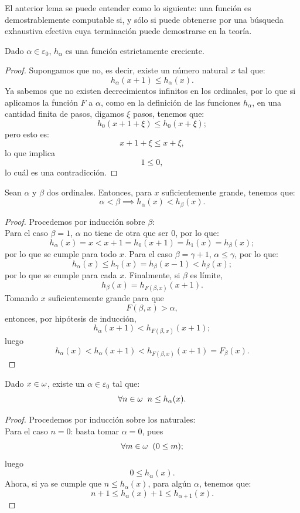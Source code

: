 \begin{obs}
    El anterior lema se puede entender como lo siguiente: una función es demostrablemente computable si, y sólo si puede obtenerse por una búsqueda exhaustiva efectiva cuya terminación puede demostrarse en la teoría.
\end{obs}

\begin{prop} \label{estcrec}
    Dado $\alpha\in\varepsilon_0$, $h_\alpha$ es una función estrictamente creciente.
\end{prop}
\begin{proof}
    Supongamos que no, es decir, existe un número natural $x$ tal que:
    \[h_\alpha(x+1)\leq h_\alpha(x).\]
    Ya sabemos que no existen decrecimientos infinitos en los ordinales, por lo que si aplicamos la función $F$ a $\alpha$, como en la definición de las funciones $h_\alpha$, en una cantidad finita de pasos, digamos $\xi$ pasos, tenemos que:
    \[h_0(x+1+\xi)\leq h_0(x+\xi);\]
    pero esto es:
    \[x+1+\xi\leq x+\xi,\]
    lo que implica
    \[1\leq 0,\]
    lo cuál es una contradicción.
\end{proof}
\begin{prop} \label{paralonoestandarxdxdxd}
    Sean $\alpha$ y $\beta$ dos ordinales. Entonces, para $x$ suficientemente grande, tenemos que:
    \[\alpha<\beta\implies h_\alpha(x)<h_\beta(x).\]
\end{prop}
\begin{proof}
    Procedemos por inducción sobre $\beta$:\\
    Para el caso $\beta=1$, $\alpha$ no tiene de otra que ser $0$, por lo que:
    \[h_\alpha(x)=x<x+1=h_0(x+1)=h_1(x)=h_\beta(x);\]
    por lo que se cumple para todo $x$. Para el caso $\beta=\gamma+1$, $\alpha\leq\gamma$, por lo que:
    \[h_\alpha(x)\leq h_\gamma(x)=h_\beta(x-1)<h_\beta(x);\]
    por lo que se cumple para cada $x$.
    Finalmente, si $\beta$ es límite,
    \[h_\beta(x)=h_{F(\beta,x)}(x+1).\]
    Tomando $x$ suficientemente grande para que 
    \[F(\beta,x)>\alpha,\]
    entonces, por hipótesis de inducción,
    \[h_\alpha(x+1)<h_{F(\beta,x)}(x+1);\]
    luego
    \[h_\alpha(x)<h_\alpha(x+1)<h_{F(\beta,x)}(x+1)=F_\beta(x).\]
\end{proof}

\begin{lem} \label{LEMAAUX2}
    Dado $x\in\omega$, existe un $\alpha\in\varepsilon_0$ tal que:
    \[\forall n\in\omega\hspace{0.2cm}n\leq h_\alpha(x).\]
\end{lem}
\begin{proof}
    Procedemos por inducción sobre los naturales:\\
    Para el caso $n=0$: basta tomar $\alpha=0$, pues 
    \[\forall m\in\omega\hspace{0.2cm}(0\leq m);\]
    luego
    \[0\leq h_\alpha(x).\]
    Ahora, si ya se cumple que $n\leq h_\alpha(x)$, para algún $\alpha$, tenemos que:
    \[n+1\leq h_\alpha(x)+1\leq h_{\alpha+1}(x).\]
\end{proof}

